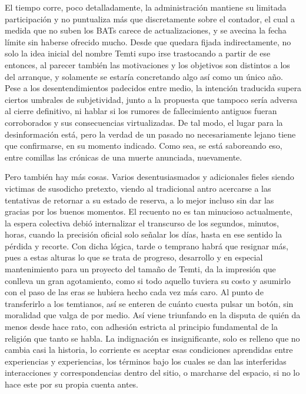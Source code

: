 \documentclass[
]{book}
\begin{document}
El tiempo corre, poco detalladamente, la administración mantiene su limitada participación y no puntualiza más que discretamente sobre el contador, el cual a medida que no suben los BATs carece de actualizaciones, y se avecina la fecha límite sin haberse ofrecido mucho. Desde que quedara fijada indirectamente, no solo la idea inicial del nombre Temti supo irse trastocando a partir de ese entonces, al parecer también las motivaciones y los objetivos son distintos a los del arranque, y solamente se estaría concretando algo así como un único año. Pese a los desentendimientos padecidos entre medio, la intención traducida supera ciertos umbrales de subjetividad, junto a la propuesta que tampoco sería adversa al cierre definitivo, ni hablar si los rumores de fallecimiento antiguos fueran corroborados y sus consecuencias virtualizadas. De tal modo, el lugar para la desinformación está, pero la verdad de un pasado no necesariamente lejano tiene que confirmarse, en su momento indicado. Como sea, se está saboreando eso, entre comillas las crónicas de una muerte anunciada, nuevamente.

Pero también hay más cosas. Varios desentusiasmados y adicionales fieles siendo victimas de susodicho pretexto, viendo al tradicional antro acercarse a las tentativas de retornar a su estado de reserva, a lo mejor incluso sin dar las gracias por los buenos momentos. El recuento no es tan minucioso actualmente, la espera colectiva debió internalizar el transcurso de los segundos, minutos, horas, cuando la precisión oficial solo señalar los días, hasta en ese sentido la pérdida y recorte. Con dicha lógica, tarde o temprano habrá que resignar más, pues a estas alturas lo que se trata de progreso, desarrollo y en especial mantenimiento para un proyecto del tamaño de Temti, da la impresión que conlleva un gran agotamiento, como si todo aquello tuviera su costo y asumirlo con el paso de las eras se hubiera hecho cada vez más caro. Al punto de transferirlo a los temtianos, así se enteren de cuánto cuesta pulsar un botón, sin moralidad que valga de por medio. Así viene triunfando en la disputa de quién da menos desde hace rato, con adhesión estricta al principio fundamental de la religión que tanto se habla. La indignación es insignificante, solo es relleno que no cambia casi la historia, lo corriente es aceptar esas condiciones aprendidas entre experiencias y experiencias, los términos bajo los cuales se dan las interferidas interacciones y correspondencias dentro del sitio, o marcharse del espacio, si no lo hace este por su propia cuenta antes.
\end{document}
